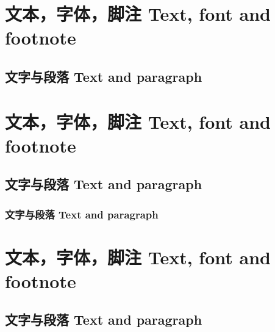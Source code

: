 \documentclass[draft,twoside]{fduthesis}
\begin{document}
\chapter{文本，字体，脚注 \quad Text, font and footnote}
\section{文字与段落 Text and paragraph}
\zhlipsum[1-2]

\chapter{文本，字体，脚注 \quad Text, font and footnote}

\section{文字与段落 Text and paragraph}

\subsection{文字与段落 Text and paragraph}
\zhlipsum[1-2]

\chapter{文本，字体，脚注 \quad Text, font and footnote}

{}
\section{文字与段落 Text and paragraph}
\zhlipsum[1-2]
\end{document}
